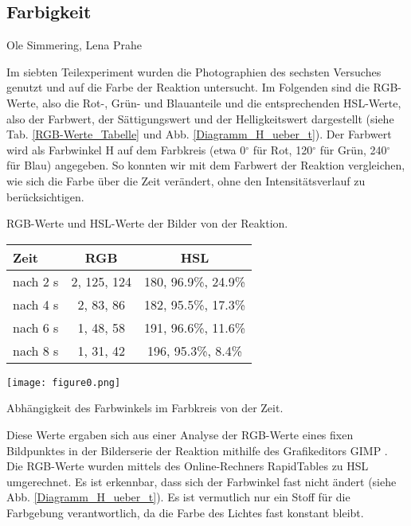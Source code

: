 \subsection{Farbigkeit}

Ole Simmering, Lena Prahe 

Im siebten Teilexperiment wurden die Photographien des sechsten Versuches genutzt und auf die Farbe der Reaktion untersucht. Im Folgenden sind die RGB-Werte, also die Rot-, Grün- und Blauanteile und die entsprechenden HSL-Werte, also der Farbwert, der Sättigungswert und der Helligkeitswert dargestellt (siehe Tab. \ref{RGB-Werte_Tabelle} und Abb. \ref{Diagramm_H_ueber_t}). Der Farbwert wird als Farbwinkel H auf dem Farbkreis (etwa 0$^\circ$ für Rot, 120$^\circ$ für Grün, 240$^\circ$ für Blau) angegeben. So konnten wir mit dem Farbwert der Reaktion vergleichen, wie sich die Farbe über die Zeit verändert, ohne den Intensitätsverlauf zu berücksichtigen.

\begin{dsatable}
 \centering
 \caption{RGB-Werte und HSL-Werte der Bilder von der Reaktion.}
 \begin{tabular}{lcc} %
  \toprule
   Zeit  & RGB & HSL\\
  \midrule
   nach 2 s  & 2, 125, 124 &   180, 96.9\%, 24.9\%    \\
   nach 4 s  & 2, 83, 86   &   182, 95.5\%, 17.3\%    \\
   nach 6 s  & 1, 48, 58   &   191, 96.6\%, 11.6\%    \\
   nach 8 s  & 1, 31, 42   &   196, 95.3\%, 8.4\%     \\ 
  \bottomrule
 \end{tabular}
 \label{RGB-Werte_Tabelle}
 
\end{dsatable}

\begin{dsafigure}
	\centering
	\texttt{[image: figure0.png]}
	\label{Diagramm_H_ueber_t}
	\caption{Abhängigkeit des Farbwinkels im Farbkreis von der Zeit.}
\end{dsafigure}

Diese Werte ergaben sich aus einer Analyse der RGB-Werte eines fixen Bildpunktes in der Bilderserie der Reaktion mithilfe des Grafikeditors GIMP \cite{GIMP}. Die RGB-Werte wurden mittels des Online-Rechners RapidTables \cite{RapidTables} zu HSL umgerechnet. Es ist erkennbar, dass sich der Farbwinkel fast nicht ändert (siehe Abb. \ref{Diagramm_H_ueber_t}). Es ist vermutlich nur ein Stoff für die Farbgebung verantwortlich, da die Farbe des Lichtes fast konstant bleibt.
